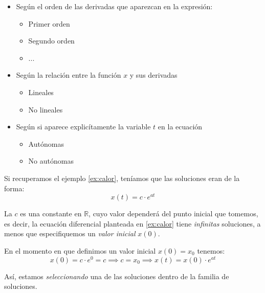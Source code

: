 \begin{itemize}
\item Según el orden de las derivadas que aparezcan en la expresión:
	\begin{itemize}
	\item Primer orden
	\item Segundo orden
	\item ...
	\end{itemize}
\item Según la relación entre la función $x$ y sus derivadas
	\begin{itemize}
	\item Lineales
	\item No lineales
	\end{itemize}
\item Según si aparece explicítamente la variable $t$ en la ecuación
	\begin{itemize}
	\item Autónomas
	\item No autónomas
	\end{itemize}
\end{itemize}

Si recuperamos el ejemplo \ref{ex:calor}, teníamos que las soluciones eran de la forma:
\begin{equation}
x(t) = c \cdot e^{at}
\end{equation}

La $c$ es una constante en $\mathbb{R}$, cuyo valor dependerá del punto inicial que tomemos, es decir, la ecuación diferencial planteada en \ref{ex:calor} tiene \emph{infinitas} soluciones, a menos que especifiquemos un \emph{valor inicial} $x(0)$.

En el momento en que definimos un valor inicial $x(0)=x_0$ tenemos:
\[x(0)=c\cdot e^0=c \implies c=x_0 \implies x(t) = x(0)\cdot e^{at}\]

Así, estamos \emph{seleccionando} una de las soluciones dentro de la familia de soluciones.


\begin{center}
\end{center}

